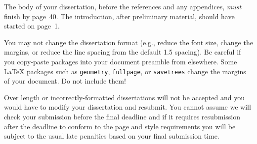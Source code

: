\documentclass[bsc,frontabs,singlespacing,parskip,deptreport,normalheadings]{infthesis}
\begin{document}
The body of your dissertation, before the references and any appendices,
\emph{must} finish by page~40. The introduction, after preliminary material,
should have started on page~1.

You may not change the dissertation format (e.g., reduce the font size, change
the margins, or reduce the line spacing from the default 1.5 spacing). Be
careful if you copy-paste packages into your document preamble from elsewhere.
Some \LaTeX{} packages such as \texttt{geometry}, \texttt{fullpage}, or
\texttt{savetrees} change the margins of your document. Do not include them!

Over length or incorrectly-formatted dissertations will not be accepted and you
would have to modify your dissertation and resubmit. You cannot assume we will
check your submission before the final deadline and if it requires resubmission
after the deadline to conform to the page and style requirements you will be
subject to the usual late penalties based on your final submission time.




%
%
%
\end{document}
